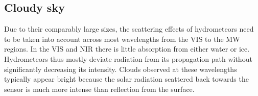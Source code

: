 %
%
%
%

\subsection{Cloudy sky}

Due to their comparably large sizes, the scattering effects of hydrometeors need
to be taken into account across most wavelengths from the VIS to the MW regions.
In the VIS and NIR there is little absorption from either water or ice.
Hydrometeors thus mostly deviate radiation from its propagation path without
significantly decreasing its intensity. Clouds observed at these wavelengths
typically appear bright because the solar radiation scattered back towards
the sensor is much more intense than reflection from the surface.


